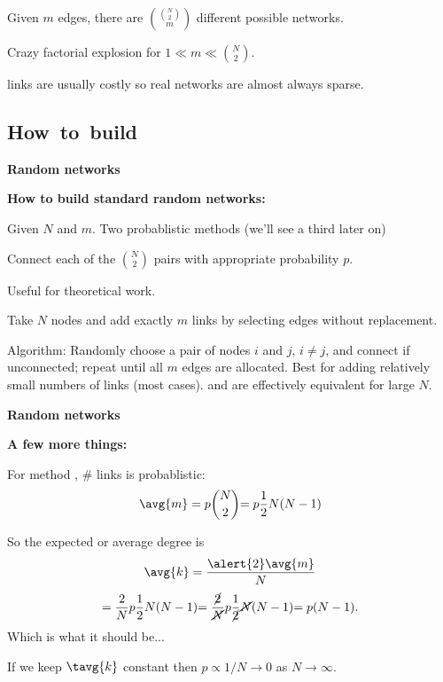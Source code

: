 \begin{frame}[label=]
\begin{frame}[label=]
\begin{frame}[label=]
      Given $m$ edges, there are 
      $ \binom{\binom{N}{2}}{m} $
      different possible networks.
    
      Crazy factorial explosion for $1 \ll m \ll \binom{N}{2}$.
    
       links are usually costly
      so real networks are almost always \alert{sparse}.
    
  


\subsection{How\ to\ build}

\begin{frame}[label=]
  \textbf{Random networks}

  \textbf{How to build standard random networks:}
    
     Given $N$ and $m$.
     Two probablistic methods {(we'll see a third later on)}
    
    
     Connect each of the $\binom{N}{2}$ pairs 
      with appropriate probability $p$.
        
         \alert{Useful for theoretical work.}
        
       Take $N$ nodes and add exactly $m$ links
        by selecting edges without replacement.
        
         \alert{Algorithm:} Randomly choose a pair of nodes $i$ and $j$, $i \ne j$,
          and connect if unconnected; repeat until all $m$ edges
          are allocated.
         Best for adding relatively small numbers of links (most cases).
          and  are effectively equivalent
          for large $N$.
        
    
  


  \textbf{Random networks}

  \textbf{A few more things:}
  
  
    For method , \# links is
    probablistic:
    $$
    \avg{m} = p \binom{N}{2} {= p\frac{1}{2}N(N-1)}
    $$
  
    So the expected or \alert{average degree} is 
    $$
    \avg{k} = \frac{\alert{2} \avg{m}}{N} 
    $$
    $$
    {
      = \frac{2}{N} p\frac{1}{2}N(N-1)
    }
    {
      = \frac{\cancel{2}}{\cancel{N}} p\frac{1}{\cancel{2}}\cancel{N}(N-1)
      }
    {
      = p(N-1).
    }
    $$
   Which is what it should be...
   
    If we keep $\tavg{k}$ constant then
    $p \propto 1/N \rightarrow 0$ as $N \rightarrow \infty$.
  

\end{frame}
\end{frame}
\end{frame}
\end{frame}

